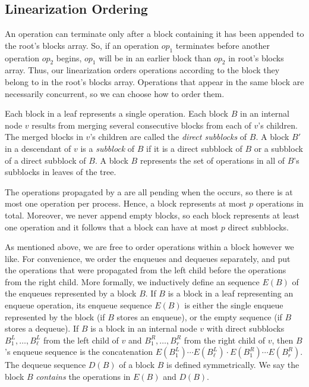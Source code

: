 \subsection{Linearization Ordering}

An operation can terminate only after a block containing it has been appended to the root's blocks array.
So, if an operation $op_1$ terminates before another operation $op_2$ begins, 
$op_1$ will be in an earlier block than $op_2$ in root's blocks array.
Thus, our linearization orders operations according to the block they belong to in the root's blocks array.
Operations that appear in the same block are necessarily concurrent, so we can choose how to order them.

Each block in a leaf represents a single operation.
Each block $B$ in an internal node $v$ results from merging
several consecutive blocks from each of $v$'s children.
The merged blocks in $v$'s children are called the \emph{direct subblocks} of $B$.
A block $B'$ in a descendant of $v$ is a \emph{subblock} of $B$ if it is a direct subblock of $B$
or a subblock of a direct subblock of $B$.
A block $B$ represents the set of operations in all of $B$'s subblocks in leaves of the tree.

The operations propagated by a  are all pending when the  occurs,
so there is at most one operation per process.
Hence, a block represents at most $p$ operations in total.  
Moreover, we never append empty blocks, so 
each block represents at least one operation and it follows that a block can have at most $p$ direct subblocks.

As mentioned above, we are free to order operations within a block however we like.
For convenience, we order the enqueues and dequeues separately, and put the 
operations that were propagated from the left child before the operations from the right child.
More formally, we inductively define an sequence $E(B)$ of the enqueues represented by a block $B$.
If $B$ is a block in a leaf representing an enqueue operation, its enqueue sequence $E(B)$ is either the single
enqueue represented by the block (if $B$ stores an enqueue), or the empty sequence (if $B$ stores a dequeue).
If $B$ is a block in an internal node $v$ with direct subblocks $B^L_1, \ldots, B^L_\ell$ from the left child of $v$
and $B^R_1,\ldots,B^R_r$ from the right child of $v$, then $B$'s enqueue sequence is the concatenation $E(B^L_1)\cdots E(B^L_\ell)\cdot E(B^R_1) \cdots E(B^R_r)$.
The dequeue sequence $D(B)$ of a block $B$ is defined symmetrically.  We say the block $B$ \emph{contains} the operations in $E(B)$ and $D(B)$.

